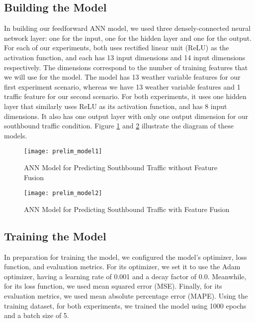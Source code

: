 \subsection{Building the Model}
In building our feedforward ANN model, we used three densely-connected neural network layer: one for the input, one for the hidden layer and one for the output. For each of our experiments, both uses rectified linear unit (ReLU) as the activation function, and each has 13 input dimensions and 14 input dimensions respectively. The dimensions correspond to the number of training features that we will use for the model. The model has 13 weather variable features for our first experiment scenario, whereas we have 13 weather variable features and 1 traffic feature for our second scenario. For both experiments, it uses one hidden layer that similarly uses ReLU as its activation function, and has 8 input dimensions. It also has one output layer with only one output dimension for our southbound traffic condition. Figure \ref{prelim_model1} and \ref{prelim_model2} illustrate the diagram of these models.


\begin{figure}[h]
\caption{ANN Model for Predicting Southbound Traffic without Feature Fusion}
\centering
\texttt{[image: prelim\_model1]}
\label{prelim_model1}
\end{figure}

\begin{figure}[h]
\caption{ANN Model for Predicting Southbound Traffic with Feature Fusion}
\centering
\texttt{[image: prelim\_model2]}
\label{prelim_model2}
\end{figure}


\subsection{Training the Model}
In preparation for training the model, we configured the model’s optimizer, loss function, and evaluation metrics. For its optimizer, we set it to use the Adam optimizer, having a learning rate of 0.001 and a decay factor of 0.0. Meanwhile, for its loss function, we used mean squared error (MSE). Finally, for its evaluation metrics, we used mean absolute percentage error (MAPE). Using the training dataset, for both experiments, we trained the model using 1000 epochs and a batch size of 5. 



